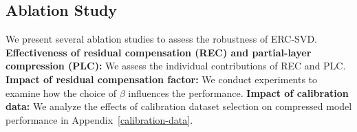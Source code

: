\begin{table}[ht]
\centering
\caption{Perplexity (\textcolor{blue}{$\downarrow$}) and zero-shot individual and average accuracy (\textcolor{green!60!black}{$\uparrow$}) of LLaMA-2-7B 30\% compressed by ERC-SVD with different residual compensation factors ($\beta$).}
\label{tab:residual_compensation_factor}
\small
{}
\end{table}


\subsection{Ablation Study}
We present several ablation studies to assess the robustness of ERC-SVD. 
 \textbf{Effectiveness of residual compensation (REC) and partial-layer compression (PLC):} We assess the individual contributions of REC and PLC.
 \textbf{Impact of residual compensation factor:} We conduct experiments to examine how the choice of $\beta$ influences the performance.
 \textbf{Impact of calibration data:} We analyze the effects of calibration dataset selection on compressed model performance in Appendix~\ref{calibration-data}.

